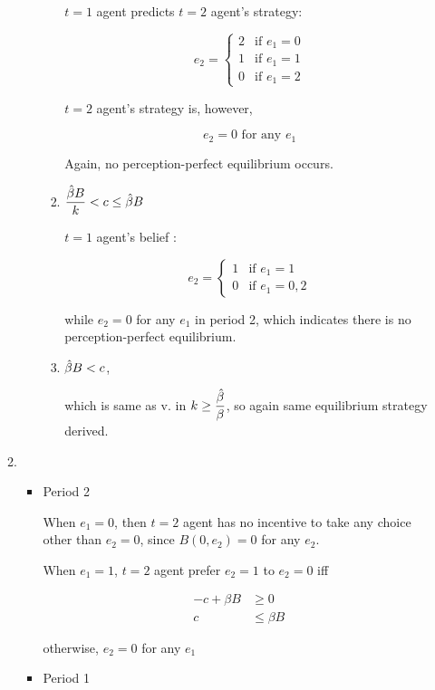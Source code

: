 \documentclass{jsarticle}
\begin{document}
\begin{enumerate}
\begin{enumerate}
\begin{itemize}
\begin{enumerate}
  $t=1$ agent predicts $t=2$ agent's strategy:
 
 \[e_2 = \begin{cases}
 2 & \text{if } e_1=0 \\
 1 & \text{if } e_1=1 \\
 0 & \text{if } e_1=2
 \end{cases} \]
 
 $t=2$ agent's strategy is, however, 
 
 \[e_2=0 \text{ for any } e_1 \]
 
 Again, no perception-perfect equilibrium occurs.
  
  \item $\dfrac{\Hat{\beta} B}{k} < c \leq \Hat{\beta}B$
  
   $t=1$ agent's belief :
 
 \[e_2 = \begin{cases}
 1 & \text{if } e_1=1 \\
 0 & \text{if } e_1=0,2
 \end{cases} \]
 
 while $e_2=0$ for any $e_1$ in period 2, which indicates there is no perception-perfect equilibrium.
 
  
  \item $\Hat{\beta}B < c$,
  
  which is same as v. in $k \geq \dfrac{\Hat{\beta}}{\beta}$, so again same equilibrium strategy derived.  
  
  \end{enumerate}
 
 \end{itemize}


\item

 \begin{itemize}
 
 \item Period 2
 
 When $e_1=0$, then $t=2$ agent has no incentive to take any choice other than $e_2=0$, since $B(0,e_2)=0$ for any $e_2$.
 
 When $e_1=1$, $t=2$ agent prefer $e_2=1$ to $e_2=0$ iff
 
 \begin{align*}
 - c + \beta B &\geq 0 \\
 c & \leq \beta B
 \end{align*}
 
 otherwise, $e_2=0$ for any $e_1$
 
 \item Period 1
 

\end{itemize}
\end{enumerate}
\end{enumerate}
\end{document}

